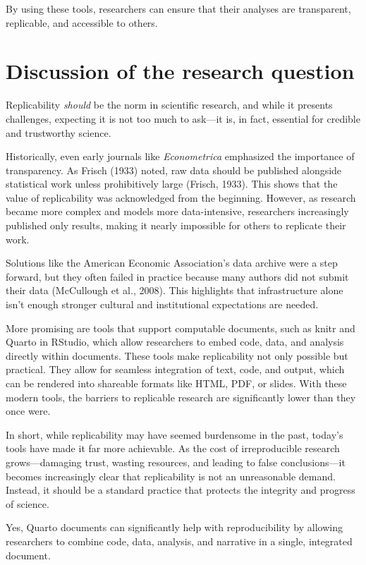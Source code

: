 \documentclass[
  a4paper,
]{article}
\begin{document}
By using these tools, researchers can ensure that their analyses are
transparent, replicable, and accessible to others.

\section{Discussion of the research
question}\label{discussion-of-the-research-question}

Replicability \emph{should} be the norm in scientific research, and
while it presents challenges, expecting it is not too much to ask---it
is, in fact, essential for credible and trustworthy science.

Historically, even early journals like \emph{Econometrica} emphasized
the importance of transparency. As Frisch (1933) noted, raw data should
be published alongside statistical work unless prohibitively large
(Frisch, 1933). This shows that the value of replicability was
acknowledged from the beginning. However, as research became more
complex and models more data-intensive, researchers increasingly
published only results, making it nearly impossible for others to
replicate their work.

Solutions like the American Economic Association's data archive were a
step forward, but they often failed in practice because many authors did
not submit their data (McCullough et al., 2008). This highlights that
infrastructure alone isn't enough stronger cultural and institutional
expectations are needed.

More promising are tools that support computable documents, such as
knitr and Quarto in RStudio, which allow researchers to embed code,
data, and analysis directly within documents. These tools make
replicability not only possible but practical. They allow for seamless
integration of text, code, and output, which can be rendered into
shareable formats like HTML, PDF, or slides. With these modern tools,
the barriers to replicable research are significantly lower than they
once were.

In short, while replicability may have seemed burdensome in the past,
today's tools have made it far more achievable. As the cost of
irreproducible research grows---damaging trust, wasting resources, and
leading to false conclusions---it becomes increasingly clear that
replicability is not an unreasonable demand. Instead, it should be a
standard practice that protects the integrity and progress of science.

Yes, Quarto documents can significantly help with reproducibility by
allowing researchers to combine code, data, analysis, and narrative in a
single, integrated document.
\end{document}
